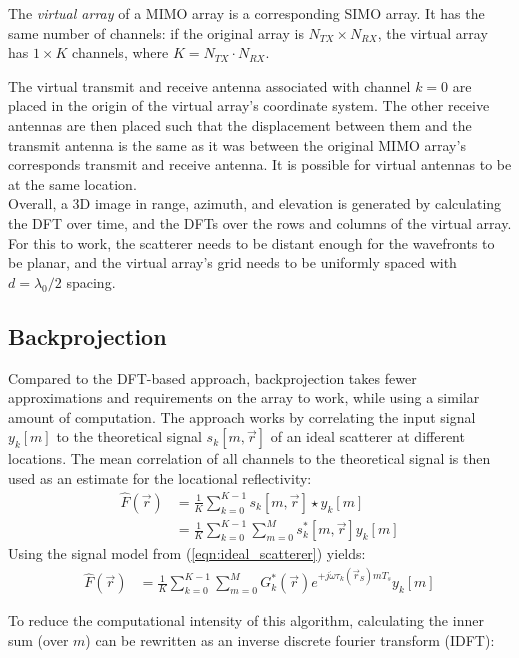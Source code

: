 The \textit{virtual array} of a MIMO array is a corresponding SIMO array.
It has the same number of channels:
if the original array is $N_{TX} \times N_{RX}$, the virtual array has $1 \times K$ channels, where $K=N_{TX} \cdot N_{RX}$.

The virtual transmit and receive antenna associated with channel $k=0$ are placed in the origin of the virtual array's coordinate system.
The other receive antennas are then placed such that the displacement between them and the transmit antenna
is the same as it was between the original MIMO array's corresponds transmit and receive antenna.
It is possible for virtual antennas to be at the same location.
\\

Overall, a 3D image in range, azimuth, and elevation is generated
by calculating the DFT over time, and the DFTs over the rows and columns of the virtual array.
For this to work, the scatterer needs to be distant enough for the wavefronts to be planar,
and the virtual array's grid needs to be uniformly spaced with $d=\lambda_0/2$ spacing.

\subsection{Backprojection}
Compared to the DFT-based approach, backprojection takes fewer approximations and requirements on the array to work,
while using a similar amount of computation.
The approach works by correlating the input signal $y_k[m]$
to the theoretical signal $s_k[m, \vec r]$ of an ideal scatterer at different locations.
The mean correlation of all channels to the theoretical signal is then used as an estimate for the locational reflectivity:
\begin{align}
    \hat F(\vec r) & = \frac{1}{K} \sum_{k=0}^{K-1} s_k[m, \vec r] \star y_k[m]             \\
                   & = \frac{1}{K}\sum_{k=0}^{K-1}\sum_{m=0}^{M} s_k^\ast[m, \vec r] y_k[m]
\end{align}
Using the signal model from (\ref*{eqn:ideal_scatterer}) yields:
\begin{align}
    \hat F(\vec r) & = \frac{1}{K}\sum_{k=0}^{K-1}\sum_{m=0}^{M}
    G_k^\ast(\vec r)e^{+j\dot\omega\tau_k(\vec r_S)mT_s} y_k[m]
\end{align}

To reduce the computational intensity of this algorithm,
calculating the inner sum (over $m$) can be rewritten as an inverse discrete fourier transform (IDFT):

